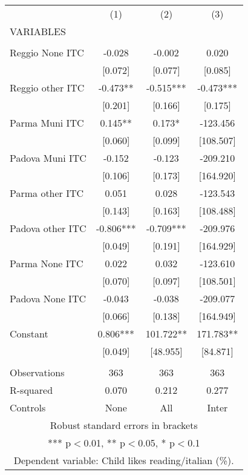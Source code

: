 \begin{tabular}{lccc} \hline
 & (1) & (2) & (3) \\
VARIABLES &  &  &  \\ \hline
 &  &  &  \\
Reggio None ITC & -0.028 & -0.002 & 0.020 \\
 & [0.072] & [0.077] & [0.085] \\
Reggio other ITC & -0.473** & -0.515*** & -0.473*** \\
 & [0.201] & [0.166] & [0.175] \\
Parma Muni ITC & 0.145** & 0.173* & -123.456 \\
 & [0.060] & [0.099] & [108.507] \\
Padova Muni ITC & -0.152 & -0.123 & -209.210 \\
 & [0.106] & [0.173] & [164.920] \\
Parma other ITC & 0.051 & 0.028 & -123.543 \\
 & [0.143] & [0.163] & [108.488] \\
Padova other ITC & -0.806*** & -0.709*** & -209.976 \\
 & [0.049] & [0.191] & [164.929] \\
Parma None ITC & 0.022 & 0.032 & -123.610 \\
 & [0.070] & [0.097] & [108.501] \\
Padova None ITC & -0.043 & -0.038 & -209.077 \\
 & [0.066] & [0.138] & [164.949] \\
Constant & 0.806*** & 101.722** & 171.783** \\
 & [0.049] & [48.955] & [84.871] \\
 &  &  &  \\
Observations & 363 & 363 & 363 \\
R-squared & 0.070 & 0.212 & 0.277 \\
 Controls & None & All & Inter \\ \hline
\multicolumn{4}{c}{ Robust standard errors in brackets} \\
\multicolumn{4}{c}{ *** p$<$0.01, ** p$<$0.05, * p$<$0.1} \\
\multicolumn{4}{c}{ Dependent variable: Child likes reading/italian (\%).} \\
\end{tabular}
